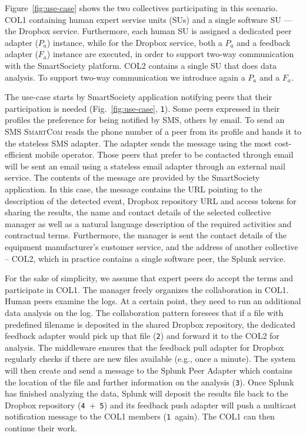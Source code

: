 \documentclass{llncs}
\newcommand{\mdl}{\textsc{SmartCom}}
\begin{document}
    
    Figure~\ref{fig:use-case} shows the two collectives participating in this scenario. COL1 containing human expert servise units (SUs) and a single software SU --- the Dropbox service. Furthermore, each human SU is assigned a dedicated peer adapter ($P_a$) instance, while for the Dropbox service, both a $P_a$ and a feedback adapter ($F_a$) instance are executed, in order to support two-way communication with the SmartSociety platform. COL2 contains a single SU that does data analysis. To support two-way communication we introduce again a $P_a$ and a $F_a$.

    The use-case starts by SmartSociety application notifying peers that their participation is needed (Fig.~\ref{fig:use-case}, \texttt{1}\degree). Some peers expressed in their profiles the preference for being notified by SMS, others by email. To send an SMS \mdl{} reads the phone number of a peer from its profile and hands it to the stateless SMS adapter. The adapter sends the message using the most cost-efficient mobile operator. Those peers that prefer to be contacted through email will be sent an email using a stateless email adapter through an external mail service.
    The contents of the message are provided by the SmartSociety application. In this case, the message contains the URL pointing to the description of the detected event, Dropbox repository URL and access tokens for sharing the results, the name and contact details of the selected collective manager as well as a natural language description of the required activities and contractual terms. Furthermore, the manager is sent the contact details of the equipment manufacturer's customer service, and the address of another collective -- COL2, which in practice contains a single software peer, the Splunk service.
    
    For the sake of simplicity, we assume that expert peers do accept the terms and participate in COL1. The manager freely organizes the collaboration in COL1. Human peers examine the logs. At a certain point, they need to run an additional data analysis on the log. The collaboration pattern foresees that if a file with predefined filename is deposited in the shared Dropbox repository, the dedicated feedback adapter would pick up that file (\texttt{2}\degree) and forward it to the COL2 for analysis. The middleware ensures that the feedback pull adapter for Dropbox regularly checks if there are new files available (e.g., once a minute).
	  The system will then create and send a message to the Splunk Peer Adapter which contains the location of the file and further information on the analysis (\texttt{3}\degree). Once Splunk has finished analyzing the data, Splunk will deposit the results file back to the Dropbox repository (\texttt{4}\degree~+~\texttt{5}\degree) and its feedback push adapter will push a multicast notification message to the COL1 members (\texttt{1}\degree~again). The COL1 can then continue their work.
\end{document}
